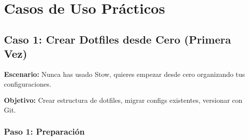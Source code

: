 \documentclass[
  doc,
  floatsintext,
  longtable,
  a4paper,
  nolmodern,
  notxfonts,
  notimes,
  12pt,
  colorlinks=true,linkcolor=blue,citecolor=blue,urlcolor=blue]{apa7}
\newenvironment{Shaded}{\begin{snugshade}}{\end{snugshade}}
\newcommand{\AttributeTok}[1]{\textcolor[rgb]{0.40,0.45,0.13}{#1}}
\newcommand{\BuiltInTok}[1]{\textcolor[rgb]{0.00,0.23,0.31}{#1}}
\newcommand{\CommentTok}[1]{\textcolor[rgb]{0.37,0.37,0.37}{#1}}
\newcommand{\ControlFlowTok}[1]{\textcolor[rgb]{0.00,0.23,0.31}{\textbf{#1}}}
\newcommand{\DecValTok}[1]{\textcolor[rgb]{0.68,0.00,0.00}{#1}}
\newcommand{\FunctionTok}[1]{\textcolor[rgb]{0.28,0.35,0.67}{#1}}
\newcommand{\KeywordTok}[1]{\textcolor[rgb]{0.00,0.23,0.31}{\textbf{#1}}}
\newcommand{\NormalTok}[1]{\textcolor[rgb]{0.00,0.23,0.31}{#1}}
\newcommand{\OperatorTok}[1]{\textcolor[rgb]{0.37,0.37,0.37}{#1}}
\newcommand{\StringTok}[1]{\textcolor[rgb]{0.13,0.47,0.30}{#1}}
\newcommand{\VariableTok}[1]{\textcolor[rgb]{0.07,0.07,0.07}{#1}}
\begin{document}
\begin{Shaded}
\end{Shaded}

\section{Casos de Uso Prácticos}\label{casos-de-uso-pruxe1cticos}

\subsection{Caso 1: Crear Dotfiles desde Cero (Primera
Vez)}\label{caso-1-crear-dotfiles-desde-cero-primera-vez}

\textbf{Escenario:} Nunca has usado Stow, quieres empezar desde cero
organizando tus configuraciones.

\textbf{Objetivo:} Crear estructura de dotfiles, migrar configs
existentes, versionar con Git.

\subsubsection{Paso 1: Preparación}\label{paso-1-preparaciuxf3n}
\end{document}
